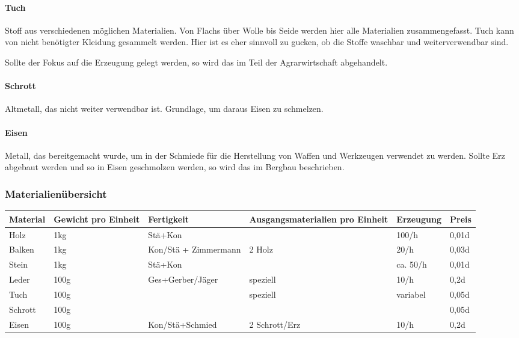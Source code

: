 \documentclass{article}
\begin{document}
\paragraph{Tuch}

Stoff aus verschiedenen möglichen Materialien. Von Flachs über Wolle bis Seide werden hier alle Materialien
zusammengefasst. Tuch kann von nicht benötigter Kleidung gesammelt werden. Hier ist es eher sinnvoll zu gucken,
ob die Stoffe waschbar und weiterverwendbar sind.

Sollte der Fokus auf die Erzeugung gelegt werden, so wird das im Teil der Agrarwirtschaft abgehandelt.

\paragraph{Schrott}

Altmetall, das nicht weiter verwendbar ist. Grundlage, um daraus Eisen zu schmelzen.

\paragraph{Eisen}

Metall, das bereitgemacht wurde, um in der Schmiede für die Herstellung von Waffen und Werkzeugen verwendet zu werden.
Sollte Erz abgebaut werden und so in Eisen geschmolzen werden, so wird das im Bergbau beschrieben.

\subsubsection{Materialienübersicht}


\begin{small}
\begin{tabular}{|m{15mm}|m{20mm}|m{4cm}|m{35mm}|m{2cm}|m{1cm}|}
\hline
\textbf{Material}&\textbf{Gewicht pro Einheit}&\textbf{Fertigkeit}&\textbf{Ausgangsmaterialien pro Einheit}&\textbf{Erzeugung}&\textbf{Preis}\\
\hline
\hline
Holz&1kg&Stä+Kon& &100/h&0,01d\\
\hline
Balken&1kg&Kon/Stä + Zimmermann&2 Holz&20/h&0,03d\\
\hline
Stein&1kg&Stä+Kon& &ca. 50/h&0,01d\\
\hline
Leder&100g&Ges+Gerber/Jäger&speziell&10/h&0,2d\\
\hline
Tuch&100g& &speziell&variabel&0,05d\\
\hline
Schrott&100g& & & &0,05d\\
\hline
Eisen&100g&Kon/Stä+Schmied&2 Schrott/Erz&10/h&0,2d\\
\hline
\end{tabular}
\end{small}
\end{document}
